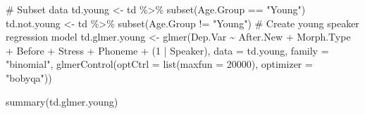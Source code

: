 \documentclass[
  10pt,
  letterpaper]{article}
\newenvironment{Shaded}{\begin{snugshade}}{\end{snugshade}}
\newcommand{\AttributeTok}[1]{\textcolor[rgb]{0.40,0.45,0.13}{#1}}
\newcommand{\CommentTok}[1]{\textcolor[rgb]{0.37,0.37,0.37}{#1}}
\newcommand{\DecValTok}[1]{\textcolor[rgb]{0.68,0.00,0.00}{#1}}
\newcommand{\FunctionTok}[1]{\textcolor[rgb]{0.28,0.35,0.67}{#1}}
\newcommand{\NormalTok}[1]{\textcolor[rgb]{0.00,0.23,0.31}{#1}}
\newcommand{\OtherTok}[1]{\textcolor[rgb]{0.00,0.23,0.31}{#1}}
\newcommand{\SpecialCharTok}[1]{\textcolor[rgb]{0.37,0.37,0.37}{#1}}
\newcommand{\StringTok}[1]{\textcolor[rgb]{0.13,0.47,0.30}{#1}}
\begin{document}
\begin{Shaded}
\begin{Highlighting}[]
\CommentTok{\# Subset data}
\NormalTok{td.young }\OtherTok{\textless{}{-}}\NormalTok{ td }\SpecialCharTok{\%\textgreater{}\%}
    \FunctionTok{subset}\NormalTok{(Age.Group }\SpecialCharTok{==} \StringTok{"Young"}\NormalTok{)}
\NormalTok{td.not.young }\OtherTok{\textless{}{-}}\NormalTok{ td }\SpecialCharTok{\%\textgreater{}\%}
    \FunctionTok{subset}\NormalTok{(Age.Group }\SpecialCharTok{!=} \StringTok{"Young"}\NormalTok{)}
\CommentTok{\# Create young speaker regression model}
\NormalTok{td.glmer.young }\OtherTok{\textless{}{-}} \FunctionTok{glmer}\NormalTok{(Dep.Var }\SpecialCharTok{\textasciitilde{}}\NormalTok{ After.New }\SpecialCharTok{+}\NormalTok{ Morph.Type }\SpecialCharTok{+}
\NormalTok{    Before }\SpecialCharTok{+}\NormalTok{ Stress }\SpecialCharTok{+}\NormalTok{ Phoneme }\SpecialCharTok{+}\NormalTok{ (}\DecValTok{1} \SpecialCharTok{|}\NormalTok{ Speaker), }\AttributeTok{data =}\NormalTok{ td.young,}
    \AttributeTok{family =} \StringTok{"binomial"}\NormalTok{, }\FunctionTok{glmerControl}\NormalTok{(}\AttributeTok{optCtrl =} \FunctionTok{list}\NormalTok{(}\AttributeTok{maxfun =} \DecValTok{20000}\NormalTok{),}
        \AttributeTok{optimizer =} \StringTok{"bobyqa"}\NormalTok{))}

\FunctionTok{summary}\NormalTok{(td.glmer.young)}
\end{Highlighting}
\end{Shaded}
\end{document}
